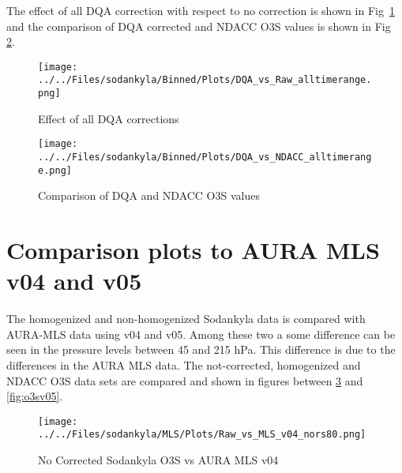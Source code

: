 The effect of all DQA correction with respect to no correction is shown in Fig~\ref{fig:dqa_all} and the comparison of DQA corrected and NDACC O3S values is shown in Fig~
\ref{fig:fig_dqa_ndacc}.

                        \begin{figure}
        \centering
\texttt{[image: ../../Files/sodankyla/Binned/Plots/DQA\_vs\_Raw\_alltimerange.png]}
    \caption{Effect of all DQA corrections}
            \label{fig:dqa_all}
    \end{figure}

                        \begin{figure}
        \centering
\texttt{[image: ../../Files/sodankyla/Binned/Plots/DQA\_vs\_NDACC\_alltimerange.png]}
    \caption{Comparison of DQA and NDACC O3S values}
            \label{fig:fig_dqa_ndacc}
    \end{figure}


\section{Comparison plots to AURA MLS v04 and v05}

    The homogenized and non-homogenized Sodankyla data is compared with AURA-MLS data using v04 and v05. Among these two a some difference
    can be seen in the pressure levels between 45 and 215 hPa. This difference is due to the differences in the AURA MLS data.
    The not-corrected, homogenized and NDACC O3S data sets are compared and shown in figures between
\ref{fig:rawv04} and \ref{fig:o3sv05}.

                            \begin{figure}
        \centering
\texttt{[image: ../../Files/sodankyla/MLS/Plots/Raw\_vs\_MLS\_v04\_nors80.png]}
    \caption{No Corrected Sodankyla O3S vs AURA MLS v04 }
            \label{fig:rawv04}
    \end{figure}



